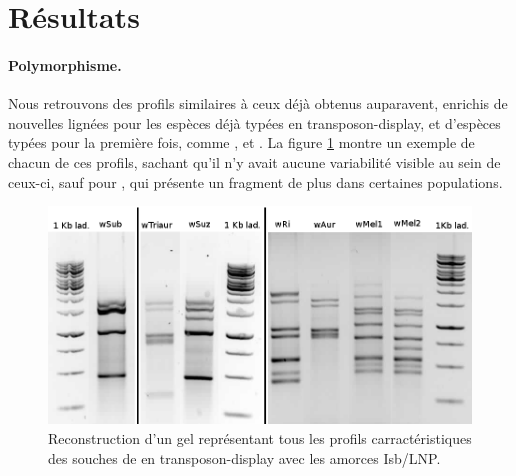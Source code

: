\section{Résultats} %
\label{sec:résultats}

\paragraph{Polymorphisme.} %
\label{par:polymorphisme}
Nous retrouvons des profils similaires à ceux déjà obtenus auparavent\cite{memHH}, enrichis de nouvelles lignées pour les espèces déjà typées en transposon-display, et d’espèces typées pour la première fois, comme ,  et .
La figure \ref{fig:profils} montre un exemple de chacun de ces profils, sachant qu’il n’y avait aucune variabilité visible au sein de ceux-ci, sauf pour , qui présente un fragment de plus %
dans certaines populations.

\begin{figure}[tb]
	\begin{center}
		\includegraphics[width=150mm]{images/profils_crop.png}
	\end{center}
	\caption{Reconstruction d'un gel représentant tous les profils carractéristiques des souches de  en transposon-display avec les amorces Isb/LNP.}
	\label{fig:profils}
\end{figure}



